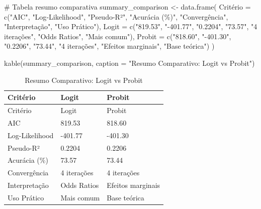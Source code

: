 \documentclass[
  letterpaper,
  DIV=11,
  numbers=noendperiod]{scrartcl}
\newenvironment{Shaded}{\begin{snugshade}}{\end{snugshade}}
\newcommand{\AttributeTok}[1]{\textcolor[rgb]{0.40,0.45,0.13}{#1}}
\newcommand{\CommentTok}[1]{\textcolor[rgb]{0.37,0.37,0.37}{#1}}
\newcommand{\FunctionTok}[1]{\textcolor[rgb]{0.28,0.35,0.67}{#1}}
\newcommand{\NormalTok}[1]{\textcolor[rgb]{0.00,0.23,0.31}{#1}}
\newcommand{\OtherTok}[1]{\textcolor[rgb]{0.00,0.23,0.31}{#1}}
\newcommand{\StringTok}[1]{\textcolor[rgb]{0.13,0.47,0.30}{#1}}
\begin{document}
\begin{Shaded}
\begin{Highlighting}[]
\CommentTok{\# Tabela resumo comparativa}
\NormalTok{summary\_comparison }\OtherTok{\textless{}{-}} \FunctionTok{data.frame}\NormalTok{(}
\NormalTok{  Critério }\OtherTok{=} \FunctionTok{c}\NormalTok{(}\StringTok{"AIC"}\NormalTok{, }\StringTok{"Log{-}Likelihood"}\NormalTok{, }\StringTok{"Pseudo{-}R²"}\NormalTok{, }\StringTok{"Acurácia (\%)"}\NormalTok{, }
               \StringTok{"Convergência"}\NormalTok{, }\StringTok{"Interpretação"}\NormalTok{, }\StringTok{"Uso Prático"}\NormalTok{),}
  \AttributeTok{Logit =} \FunctionTok{c}\NormalTok{(}\StringTok{"819.53"}\NormalTok{, }\StringTok{"{-}401.77"}\NormalTok{, }\StringTok{"0.2204"}\NormalTok{, }\StringTok{"73.57"}\NormalTok{, }\StringTok{"4 iterações"}\NormalTok{, }
            \StringTok{"Odds Ratios"}\NormalTok{, }\StringTok{"Mais comum"}\NormalTok{),}
  \AttributeTok{Probit =} \FunctionTok{c}\NormalTok{(}\StringTok{"818.60"}\NormalTok{, }\StringTok{"{-}401.30"}\NormalTok{, }\StringTok{"0.2206"}\NormalTok{, }\StringTok{"73.44"}\NormalTok{, }\StringTok{"4 iterações"}\NormalTok{, }
             \StringTok{"Efeitos marginais"}\NormalTok{, }\StringTok{"Base teórica"}\NormalTok{)}
\NormalTok{)}

\FunctionTok{kable}\NormalTok{(summary\_comparison, }\AttributeTok{caption =} \StringTok{"Resumo Comparativo: Logit vs Probit"}\NormalTok{)}
\end{Highlighting}
\end{Shaded}

\begin{longtable}[]{@{}lll@{}}
\caption{Resumo Comparativo: Logit vs Probit}\tabularnewline
\toprule\noalign{}
Critério & Logit & Probit \\
\midrule\noalign{}
\endfirsthead
\toprule\noalign{}
Critério & Logit & Probit \\
\midrule\noalign{}
\endhead
\bottomrule\noalign{}
\endlastfoot
AIC & 819.53 & 818.60 \\
Log-Likelihood & -401.77 & -401.30 \\
Pseudo-R² & 0.2204 & 0.2206 \\
Acurácia (\%) & 73.57 & 73.44 \\
Convergência & 4 iterações & 4 iterações \\
Interpretação & Odds Ratios & Efeitos marginais \\
Uso Prático & Mais comum & Base teórica \\
\end{longtable}
\end{document}
